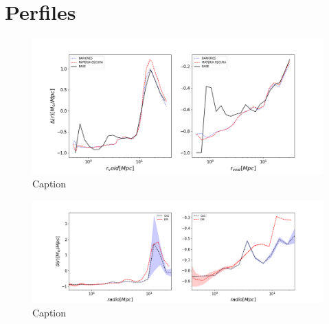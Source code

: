 \section{Perfiles}




\begin{figure}
    \centering
    \includegraphics[width=\linewidth]{Figures/PerfilesIntegradsos.png}
    \caption{Caption}
    \label{fig:my_label}
\end{figure}{}

\begin{figure}
    \centering
    \includegraphics[width=\linewidth]{Figures/perfiles_sph.png}
    \caption{Caption}
    \label{fig:my_label}
\end{figure}{}